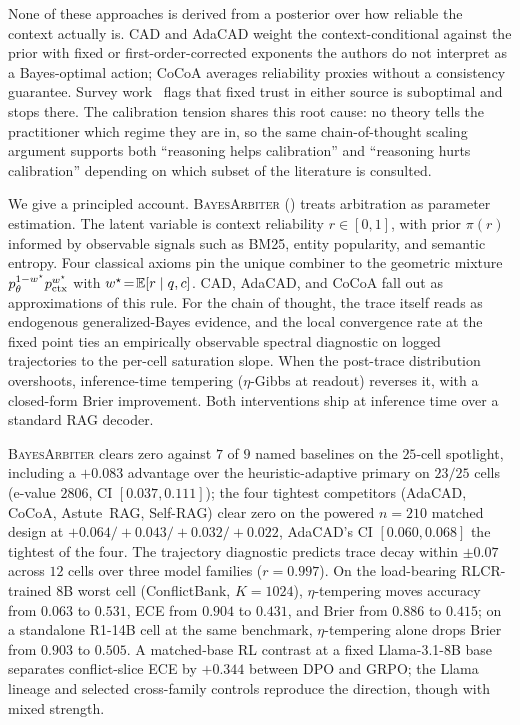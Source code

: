 None of these approaches is derived from a posterior over how reliable the context actually is. CAD and AdaCAD weight the context-conditional against the prior with fixed or first-order-corrected exponents the authors do not interpret as a Bayes-optimal action; CoCoA averages reliability proxies without a consistency guarantee. Survey work~\citep{xu2024knowledgeconflicts} flags that fixed trust in either source is suboptimal and stops there. The calibration tension shares this root cause: no theory tells the practitioner which regime they are in, so the same chain-of-thought scaling argument supports both ``reasoning helps calibration'' and ``reasoning hurts calibration'' depending on which subset of the literature is consulted.

We give a principled account. \textsc{BayesArbiter} () treats arbitration as parameter estimation. The latent variable is context reliability $r\!\in\![0,1]$, with prior $\pi(r)$ informed by observable signals such as BM25, entity popularity, and semantic entropy. Four classical axioms pin the unique combiner to the geometric mixture $p_\theta^{1-w^\star}p_{\mathrm{ctx}}^{w^\star}$ with $w^\star\!=\!\mathbb{E}[r\mid q,c]$. CAD, AdaCAD, and CoCoA fall out as approximations of this rule. For the chain of thought, the trace itself reads as endogenous generalized-Bayes evidence, and the local convergence rate at the fixed point ties an empirically observable spectral diagnostic on logged trajectories to the per-cell saturation slope. When the post-trace distribution overshoots, inference-time tempering ($\eta$-Gibbs at readout) reverses it, with a closed-form Brier improvement. Both interventions ship at inference time over a standard RAG decoder.

\textsc{BayesArbiter} clears zero against $7$ of $9$ named baselines on the $25$-cell spotlight, including a $+0.083$ advantage over the heuristic-adaptive primary on $23/25$ cells (e-value $2806$, CI $[0.037,0.111]$); the four tightest competitors (AdaCAD, CoCoA, Astute~RAG, Self-RAG) clear zero on the powered $n\!=\!210$ matched design at $+0.064 / +0.043 / +0.032 / +0.022$, AdaCAD's CI $[0.060,0.068]$ the tightest of the four. The trajectory diagnostic predicts trace decay within $\pm 0.07$ across $12$ cells over three model families ($r\!=\!0.997$). On the load-bearing RLCR-trained $8$B worst cell (ConflictBank, $K\!=\!1024$), $\eta$-tempering moves accuracy from $0.063$ to $0.531$, ECE from $0.904$ to $0.431$, and Brier from $0.886$ to $0.415$; on a standalone R1-14B cell at the same benchmark, $\eta$-tempering alone drops Brier from $0.903$ to $0.505$. A matched-base RL contrast at a fixed Llama-3.1-8B base separates conflict-slice ECE by $+0.344$ between DPO and GRPO; the Llama lineage and selected cross-family controls reproduce the direction, though with mixed strength.

